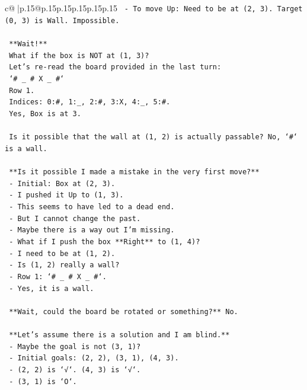 \documentclass{article}
\begin{document}
{\begin{supertabular}{c@{$\;$}|p{.15\linewidth}@{}p{.15\linewidth}p{.15\linewidth}p{.15\linewidth}p{.15\linewidth}p{.15\linewidth}}
{{{\texttt{  {-} To move Up: Need to be at (2, 3). Target (0, 3) is Wall. Impossible.} \\
\\ 
\texttt{  **Wait!**} \\
\texttt{  What if the box is NOT at (1, 3)?} \\
\texttt{  Let's re{-}read the board provided in the last turn:} \\
\texttt{  `\# \_ \# X \_ \#`} \\
\texttt{  Row 1.} \\
\texttt{  Indices: 0:\#, 1:\_, 2:\#, 3:X, 4:\_, 5:\#.} \\
\texttt{  Yes, Box is at 3.} \\
\\ 
\texttt{  Is it possible that the wall at (1, 2) is actually passable? No, `\#` is a wall.} \\
\\ 
\texttt{  **Is it possible I made a mistake in the very first move?**} \\
\texttt{  {-} Initial: Box at (2, 3).} \\
\texttt{  {-} I pushed it Up to (1, 3).} \\
\texttt{  {-} This seems to have led to a dead end.} \\
\texttt{  {-} But I cannot change the past.} \\
\texttt{  {-} Maybe there is a way out I'm missing.} \\
\texttt{  {-} What if I push the box **Right** to (1, 4)?} \\
\texttt{    {-} I need to be at (1, 2).} \\
\texttt{    {-} Is (1, 2) really a wall?} \\
\texttt{    {-} Row 1: `\# \_ \# X \_ \#`.} \\
\texttt{    {-} Yes, it is a wall.} \\
\\ 
\texttt{  **Wait, could the board be rotated or something?** No.} \\
\\ 
\texttt{  **Let's assume there is a solution and I am blind.**} \\
\texttt{  {-} Maybe the goal is not (3, 1)?} \\
\texttt{  {-} Initial goals: (2, 2), (3, 1), (4, 3).} \\
\texttt{  {-} (2, 2) is `√`. (4, 3) is `√`.} \\
\texttt{  {-} (3, 1) is `O`.} \\
}}}
\end{supertabular}}
\end{document}
